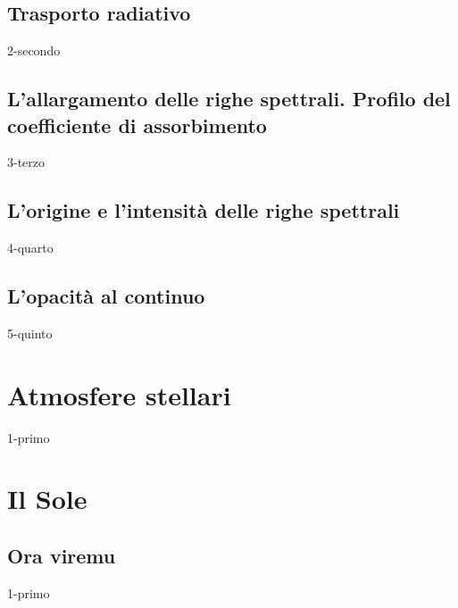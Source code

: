 \documentclass[openany,12pt]{article}
\begin{document}
    \subsection{Trasporto radiativo}
    {2-secondo}

    \subsection{L'allargamento delle righe spettrali. Profilo del coefficiente di assorbimento}
    {3-terzo}

    \subsection{L'origine e l'intensità delle righe spettrali}
    {4-quarto}

    \subsection{L'opacità al continuo}
    {5-quinto}

  \newpage

  \section{Atmosfere stellari}
    {1-primo}

  \newpage

  \section{Il Sole}
    \subsection{Ora viremu}
    {1-primo}
\end{document}
